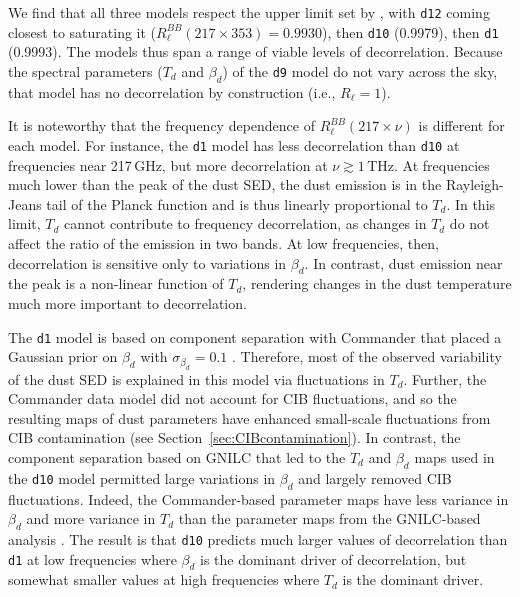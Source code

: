 \documentclass[twocolumn]{aastex631}
\begin{document}
We find that all three models respect the upper limit set by \citet{planck2016-l11A}, with \texttt{d12} coming closest to saturating it ($R_\ell^{BB}(217\times353) = 0.9930$), then \texttt{d10} (0.9979), then \texttt{d1} (0.9993). The models thus span a range of viable levels of decorrelation. Because the spectral parameters ($T_d$ and $\beta_d$) of the \texttt{d9} model do not vary across the sky, that model has no decorrelation by construction (i.e., $R_\ell = 1$).

It is noteworthy that the frequency dependence of $R_\ell^{BB}(217\times\nu)$ is different for each model. For instance, the \texttt{d1} model has less decorrelation than \texttt{d10} at frequencies near 217\,GHz, but more decorrelation at $\nu \gtrsim 1$\,THz. At frequencies much lower than the peak of the dust SED, the dust emission is in the Rayleigh-Jeans tail of the Planck function and is thus linearly proportional to $T_d$. In this limit, $T_d$ cannot contribute to frequency decorrelation, as changes in $T_d$ do not affect the ratio of the emission in two bands. At low frequencies, then, decorrelation is sensitive only to variations in $\beta_d$. In contrast, dust emission near the peak is a non-linear function of $T_d$, rendering changes in the dust temperature much more important to decorrelation. 

The \texttt{d1} model is based on component separation with Commander that placed a Gaussian prior on $\beta_d$ with $\sigma_{\beta_d} = 0.1$ \citep{planck2014-a12}. Therefore, most of the observed variability of the dust SED is explained in this model via fluctuations in $T_d$. Further, the Commander data model did not account for CIB fluctuations, and so the resulting maps of dust parameters have enhanced small-scale fluctuations from CIB contamination (see Section~\ref{sec:CIBcontamination}). In contrast, the component separation based on GNILC that led to the $T_d$ and $\beta_d$ maps used in the \texttt{d10} model \citep{planck2016-XLVIII} permitted large variations in $\beta_d$ and largely removed CIB fluctuations. Indeed, the Commander-based parameter maps have less variance in $\beta_d$ and more variance in $T_d$ than the parameter maps from the GNILC-based analysis \citep[see][Table~1]{planck2016-XLVIII}. The result is that \texttt{d10} predicts much larger values of decorrelation than \texttt{d1} at low frequencies where $\beta_d$ is the dominant driver of decorrelation, but somewhat smaller values at high frequencies where $T_d$ is the dominant driver.
\end{document}
